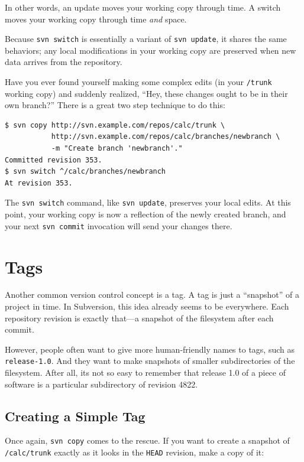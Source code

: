In other words, an update moves your working copy through time. A switch
moves your working copy through time \emph{and} space.

Because \texttt{svn\ switch} is essentially a variant of
\texttt{svn\ update}, it shares the same behaviors; any local
modifications in your working copy are preserved when new data arrives
from the repository.

Have you ever found yourself making some complex edits (in your
\texttt{/trunk} working copy) and suddenly realized, ``Hey, these
changes ought to be in their own branch?'' There is a great two step
technique to do this:

\begin{verbatim}
$ svn copy http://svn.example.com/repos/calc/trunk \
           http://svn.example.com/repos/calc/branches/newbranch \
           -m "Create branch 'newbranch'."
Committed revision 353.
$ svn switch ^/calc/branches/newbranch
At revision 353.
\end{verbatim}

The \texttt{svn\ switch} command, like \texttt{svn\ update}, preserves
your local edits. At this point, your working copy is now a reflection
of the newly created branch, and your next \texttt{svn\ commit}
invocation will send your changes there.

\section{Tags}\label{svn.branchmerge.tags}

Another common version control concept is a tag. A tag is just a
``snapshot'' of a project in time. In Subversion, this idea already
seems to be everywhere. Each repository revision is exactly that---a
snapshot of the filesystem after each commit.

However, people often want to give more human-friendly names to tags,
such as \texttt{release-1.0}. And they want to make snapshots of smaller
subdirectories of the filesystem. After all, it\textquotesingle s not so
easy to remember that release 1.0 of a piece of software is a particular
subdirectory of revision 4822.

\subsection{Creating a Simple Tag}\label{svn.branchmerge.tags.mksimple}

Once again, \texttt{svn\ copy} comes to the rescue. If you want to
create a snapshot of \texttt{/calc/trunk} exactly as it looks in the
\texttt{HEAD} revision, make a copy of it:

